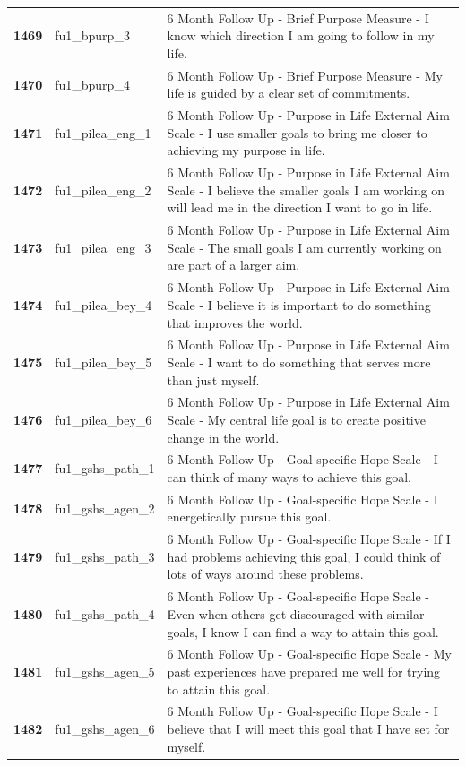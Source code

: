 \documentclass[
  letterpaper,
  DIV=11,
  numbers=noendperiod]{scrartcl}
\begin{document}
\begin{longtable}[t]{>{}cll}
\textbf{1469} & fu1\_bpurp\_3 & 6 Month Follow Up - Brief Purpose Measure - I know which direction I am going to follow in my life.\\
\textbf{1470} & fu1\_bpurp\_4 & 6 Month Follow Up - Brief Purpose Measure - My life is guided by a clear set of commitments.\\
\addlinespace
\textbf{1471} & fu1\_pilea\_eng\_1 & 6 Month Follow Up - Purpose in Life External Aim Scale - I use smaller goals to bring me closer to achieving my purpose in life.\\
\textbf{1472} & fu1\_pilea\_eng\_2 & 6 Month Follow Up - Purpose in Life External Aim Scale - I believe the smaller goals I am working on will lead me in the direction I want to go in life.\\
\textbf{1473} & fu1\_pilea\_eng\_3 & 6 Month Follow Up - Purpose in Life External Aim Scale - The small goals I am currently working on are part of a larger aim.\\
\textbf{1474} & fu1\_pilea\_bey\_4 & 6 Month Follow Up - Purpose in Life External Aim Scale - I believe it is important to do something that improves the world.\\
\textbf{1475} & fu1\_pilea\_bey\_5 & 6 Month Follow Up - Purpose in Life External Aim Scale - I want to do something that serves more than just myself.\\
\addlinespace
\textbf{1476} & fu1\_pilea\_bey\_6 & 6 Month Follow Up - Purpose in Life External Aim Scale - My central life goal is to create positive change in the world.\\
\textbf{1477} & fu1\_gshs\_path\_1 & 6 Month Follow Up - Goal-specific Hope Scale - I can think of many ways to achieve this goal.\\
\textbf{1478} & fu1\_gshs\_agen\_2 & 6 Month Follow Up - Goal-specific Hope Scale - I energetically pursue this goal.\\
\textbf{1479} & fu1\_gshs\_path\_3 & 6 Month Follow Up - Goal-specific Hope Scale - If I had problems achieving this goal, I could think of lots of ways around these problems.\\
\textbf{1480} & fu1\_gshs\_path\_4 & 6 Month Follow Up - Goal-specific Hope Scale - Even when others get discouraged with similar goals, I know I can find a way to attain this goal.\\
\addlinespace
\textbf{1481} & fu1\_gshs\_agen\_5 & 6 Month Follow Up - Goal-specific Hope Scale - My past experiences have prepared me well for trying to attain this goal.\\
\textbf{1482} & fu1\_gshs\_agen\_6 & 6 Month Follow Up - Goal-specific Hope Scale - I believe that I will meet this goal that I have set for myself.\\

\end{longtable}
\end{document}
